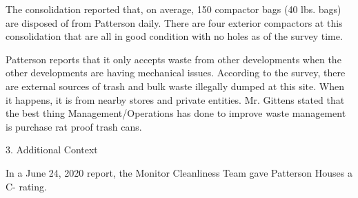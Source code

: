The consolidation reported that, on average, 150 compactor bags (40 lbs. bags) are disposed of from Patterson daily. There are four exterior compactors at this consolidation that are all in good condition with no holes as of the survey time.  

Patterson reports that it only accepts waste from other developments when the other developments are having mechanical issues.  According to the survey, there are external sources of trash and bulk waste illegally dumped at this site. When it happens, it is from nearby stores and private entities. Mr. Gittens stated that the best thing Management/Operations has done to improve waste management is purchase rat proof trash cans.

3. Additional Context

In a June 24, 2020 report, the Monitor Cleanliness Team gave Patterson Houses a C- rating.